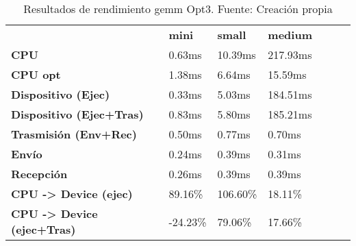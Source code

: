 \begin{table}[H]
    \centering
    \begin{tabular}{lllllll}
    \rowcolor[HTML]{DAE8FC} \ &  \textbf{mini} &  \textbf{	small} &  \textbf{	medium} \\
    \cellcolor[HTML]{DAE8FC} \textbf{CPU} & 0.63ms & 	10.39ms & 	217.93ms \\
    \rowcolor[HTML]{EFEFEF} \cellcolor[HTML]{DAE8FC} \textbf{CPU opt} & 1.38ms & 	6.64ms & 	15.59ms \\
    \cellcolor[HTML]{DAE8FC} \textbf{Dispositivo (Ejec)} & 0.33ms & 	5.03ms & 	184.51ms \\
    \rowcolor[HTML]{EFEFEF} \cellcolor[HTML]{DAE8FC} \textbf{Dispositivo (Ejec+Tras)} & 0.83ms & 	5.80ms & 	185.21ms \\
    \cellcolor[HTML]{DAE8FC} \textbf{Trasmisión (Env+Rec)} & 0.50ms & 	0.77ms & 	0.70ms \\
    \rowcolor[HTML]{EFEFEF} \cellcolor[HTML]{DAE8FC} \textbf{Envío} & 0.24ms & 	0.39ms & 	0.31ms \\
    \cellcolor[HTML]{DAE8FC} \textbf{Recepción} & 0.26ms & 	0.39ms & 	0.39ms \\
    \rowcolor[HTML]{EFEFEF} \cellcolor[HTML]{DAE8FC} \textbf{CPU -> Device (ejec)} & 89.16\% & 	106.60\% & 	18.11\% \\
    \cellcolor[HTML]{DAE8FC} \textbf{CPU -> Device (ejec+Tras)} & -24.23\% & 	79.06\% & 	17.66\% \\
    \end{tabular}
    \caption[Resultados de rendimiento gemm Opt3]{{Resultados de rendimiento gemm Opt3. Fuente: Creación propia}}
    \label{table_test_gemm_Opt3_hw_performanceResults}
\end{table}
